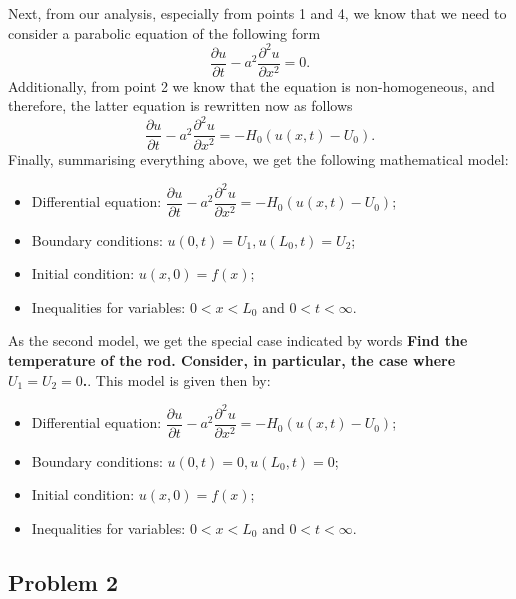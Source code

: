 Next, from our analysis, especially from points 1 and 4, we know that we need to consider a parabolic equation of the following form
\begin{equation*}
\frac{\partial u}{\partial t} - a^{2}\frac{\partial^{2} u}{\partial x^{2}} = 0.
\end{equation*}
Additionally, from point 2 we know that the equation is non-homogeneous, and therefore, the latter equation is rewritten now as follows
\begin{equation*}
\frac{\partial u}{\partial t} - a^{2}\frac{\partial^{2} u}{\partial x^{2}} = -H_{0}(u(x,t)-U_{0}).
\end{equation*}
Finally, summarising everything above, we get the following mathematical model:
\begin{itemize}
\item Differential equation: $\dfrac{\partial u}{\partial t} - a^{2}\dfrac{\partial^{2} u}{\partial x^{2}} = -H_{0}(u(x,t)-U_{0})$;
\item Boundary conditions: $u(0,t) = U_{1}, u(L_{0},t) = U_{2}$;
\item Initial condition: $u(x,0)=f(x)$;
\item Inequalities for variables: $0<x<L_{0}$ and $0<t<\infty$.
\end{itemize}
As the second model, we get the special case indicated by words {\bfseries Find the temperature of the rod. Consider, in particular, the case where $U_{1}=U_{2}=0$.}. This model is given then by:
\begin{itemize}
\item Differential equation: $\dfrac{\partial u}{\partial t} - a^{2}\dfrac{\partial^{2} u}{\partial x^{2}} = -H_{0}(u(x,t)-U_{0})$;
\item Boundary conditions: $u(0,t) = 0, u(L_{0},t) = 0$;
\item Initial condition: $u(x,0)=f(x)$;
\item Inequalities for variables: $0<x<L_{0}$ and $0<t<\infty$.
\end{itemize}

\subsection{Problem 2}

